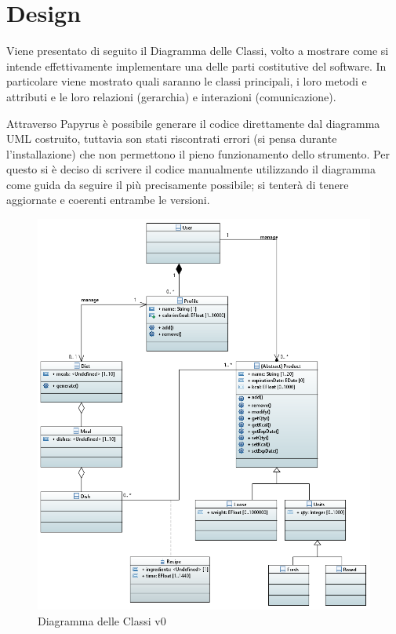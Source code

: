 \documentclass{article}
\begin{document}
\section{Design}
Viene presentato di seguito il Diagramma delle Classi, volto a mostrare come si intende effettivamente implementare una delle parti costitutive del software. In particolare viene mostrato quali saranno le classi principali, i loro metodi e attributi e le loro relazioni (gerarchia) e interazioni (comunicazione). \newline 

Attraverso Papyrus è possibile generare il codice direttamente dal diagramma UML costruito, tuttavia son stati riscontrati errori (si pensa durante l'installazione) che non permettono il pieno funzionamento dello strumento. Per questo si è deciso di scrivere il codice manualmente utilizzando il diagramma come guida da seguire il più precisamente possibile; si tenterà di tenere aggiornate e coerenti entrambe le versioni.  

\begin{figure}[H]
    \centering
    \includegraphics[width=\linewidth]{imgs/ClassDiagram.png}
    \caption{Diagramma delle Classi v0}
    \label{fig:enter-label}
\end{figure}
\end{document}
